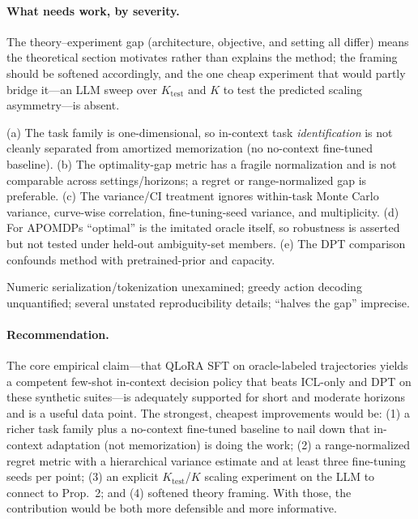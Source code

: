 \documentclass[11pt]{article}
\newcommand{\Ktest}{K_{\mathrm{test}}}
\begin{document}
\paragraph{What needs work, by severity.}
\begin{description}[leftmargin=2em,style=nextline,itemsep=3pt,topsep=2pt]
  \item[\textnormal{\textit{Major.}}] The theory--experiment gap (architecture, objective, and
  setting all differ) means the theoretical section motivates rather than explains the method;
  the framing should be softened accordingly, and the one cheap experiment that would partly
  bridge it---an LLM sweep over $\Ktest$ and $K$ to test the predicted scaling asymmetry---is
  absent.
  \item[\textnormal{\textit{Moderate.}}] (a) The task family is one-dimensional, so in-context
  task \emph{identification} is not cleanly separated from amortized memorization (no
  no-context fine-tuned baseline). (b) The optimality-gap metric has a fragile normalization and
  is not comparable across settings/horizons; a regret or range-normalized gap is preferable.
  (c) The variance/CI treatment ignores within-task Monte Carlo variance, curve-wise correlation,
  fine-tuning-seed variance, and multiplicity. (d) For APOMDPs ``optimal'' is the imitated oracle
  itself, so robustness is asserted but not tested under held-out ambiguity-set members. (e) The
  DPT comparison confounds method with pretrained-prior and capacity.
  \item[\textnormal{\textit{Minor.}}] Numeric serialization/tokenization unexamined; greedy
  action decoding unquantified; several unstated reproducibility details; ``halves the gap''
  imprecise.
\end{description}

\paragraph{Recommendation.} The core empirical claim---that QLoRA SFT on oracle-labeled
trajectories yields a competent few-shot in-context decision policy that beats ICL-only and
DPT on these synthetic suites---is adequately supported for short and moderate horizons and is
a useful data point. The strongest, cheapest improvements would be: (1) a richer task family
plus a no-context fine-tuned baseline to nail down that in-context adaptation (not memorization)
is doing the work; (2) a range-normalized regret metric with a hierarchical variance estimate
and at least three fine-tuning seeds per point; (3) an explicit $\Ktest$/$K$ scaling experiment
on the LLM to connect to Prop.\ 2; and (4) softened theory framing. With those, the contribution
would be both more defensible and more informative.
\end{document}
